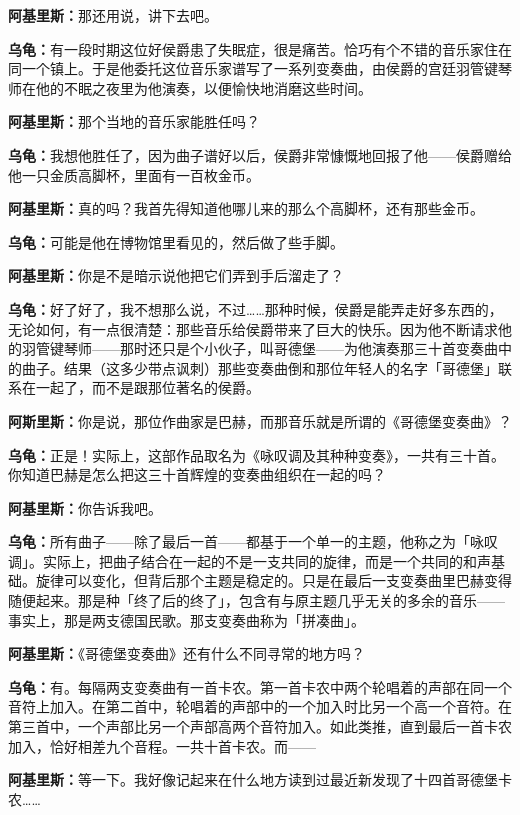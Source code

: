 \documentclass[
  12pt,
  twoside,
  openright,
  oldfontcommands,
]{memoir}
\newcommand{\dialogname}[1]{{\heifamily\bfseries #1}}
\begin{document}
\dialogname{阿基里斯：}那还用说，讲下去吧。

\dialogname{乌龟：}有一段时期这位好侯爵患了失眠症，很是痛苦。恰巧有个不错的音乐家住在同一个镇上。于是他委托这位音乐家谱写了一系列变奏曲，由侯爵的宫廷羽管键琴师在他的不眠之夜里为他演奏，以便愉快地消磨这些时间。

\dialogname{阿基里斯：}那个当地的音乐家能胜任吗？

\dialogname{乌龟：}我想他胜任了，因为曲子谱好以后，侯爵非常慷慨地回报了他------侯爵赠给他一只金质高脚杯，里面有一百枚金币。

\dialogname{阿基里斯：}真的吗？我首先得知道他哪儿来的那么个高脚杯，还有那些金币。

\dialogname{乌龟：}可能是他在博物馆里看见的，然后做了些手脚。

\dialogname{阿基里斯：}你是不是暗示说他把它们弄到手后溜走了？

\dialogname{乌龟：}好了好了，我不想那么说，不过\ldots\ldots 那种时候，侯爵是能弄走好多东西的，无论如何，有一点很清楚：那些音乐给侯爵带来了巨大的快乐。因为他不断请求他的羽管键琴师------那时还只是个小伙子，叫哥德堡------为他演奏那三十首变奏曲中的曲子。结果（这多少带点讽刺）那些变奏曲倒和那位年轻人的名字「哥德堡」联系在一起了，而不是跟那位著名的侯爵。

\dialogname{阿斯里斯：}你是说，那位作曲家是巴赫，而那音乐就是所谓的《哥德堡变奏曲》？

\dialogname{乌龟：}正是！实际上，这部作品取名为《咏叹调及其种种变奏》，一共有三十首。你知道巴赫是怎么把这三十首辉煌的变奏曲组织在一起的吗？

\dialogname{阿基里斯：}你告诉我吧。

\dialogname{乌龟：}所有曲子------除了最后一首------都基于一个单一的主题，他称之为「咏叹调」。实际上，把曲子结合在一起的不是一支共同的旋律，而是一个共同的和声基础。旋律可以变化，但背后那个主题是稳定的。只是在最后一支变奏曲里巴赫变得随便起来。那是种「终了后的终了」，包含有与原主题几乎无关的多余的音乐------事实上，那是两支德国民歌。那支变奏曲称为「拼凑曲」。

\dialogname{阿基里斯：}《哥德堡变奏曲》还有什么不同寻常的地方吗？

\dialogname{乌龟：}有。每隔两支变奏曲有一首卡农。第一首卡农中两个轮唱着的声部在同一个音符上加入。在第二首中，轮唱着的声部中的一个加入时比另一个高一个音符。在第三首中，一个声部比另一个声部高两个音符加入。如此类推，直到最后一首卡农加入，恰好相差九个音程。一共十首卡农。而------

\dialogname{阿基里斯：}等一下。我好像记起来在什么地方读到过最近新发现了十四首哥德堡卡农\ldots\ldots{}
\end{document}
